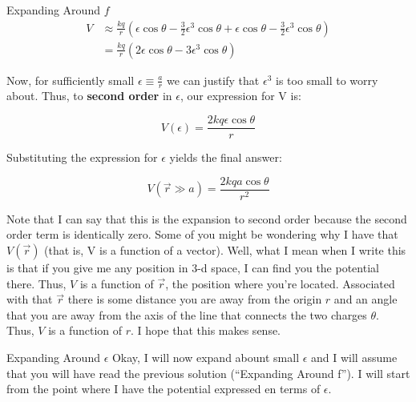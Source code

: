 \begin{homeworkProblem}[Quiz 4]
\begin{homeworkSection}{Expanding Around $f$}
    \begin{align}
        \label{}
        V &\approx \frac{k q }{r}
        \left(
        \epsilon\cos\theta- \frac{3}{2}\epsilon^3\cos\theta
        +\epsilon\cos\theta - \frac{3}{2} \epsilon^3\cos\theta
        \right) \nonumber \\
        &= \frac{k q }{r}\left(
        2\epsilon\cos\theta- 3\epsilon^3\cos\theta
            \right) \nonumber
    \end{align}

    Now, for sufficiently small $\epsilon \equiv \frac{a}{r}$ we can
    justify that $\epsilon^3$ is too small to worry about. Thus, to
    \textbf{second order} in $\epsilon$, our expression for V is:

    \[
    V(\epsilon)= \frac{2kq\epsilon \cos\theta}{r}
    \]

    Substituting the expression for $\epsilon$ yields the final answer:


    \[
    V(\vec{r}\gg a)= \frac{2kq a\cos\theta}{r^2}
    \]

    Note that I can say that this is the expansion to second order
    because the second order term is identically zero. Some of you might
    be wondering why I have that $V(\vec{r})$ (that is, V is a function
    of a vector). Well, what I mean when I write this is that if you
    give me any position in 3-d space, I can find you the potential
    there. Thus, $V$ is a function of $\vec{r}$, the position where
    you're located. Associated with that $\vec{r}$ there is some
    distance you are away from the origin $r$ and an angle that you are
    away from the axis of the line that connects the two charges
    $\theta$. Thus, $V$ is a function of $r$. I hope that this makes
    sense.


\end{homeworkSection}
\begin{homeworkSection}{Expanding Around $\epsilon$}
    Okay, I will now expand abount small $\epsilon$ and I will assume
    that you will have read the previous solution (``Expanding Around
    f''). I will start from the point where I have the potential
    expressed en terms of $\epsilon$.


\end{homeworkSection}
\end{homeworkProblem}
